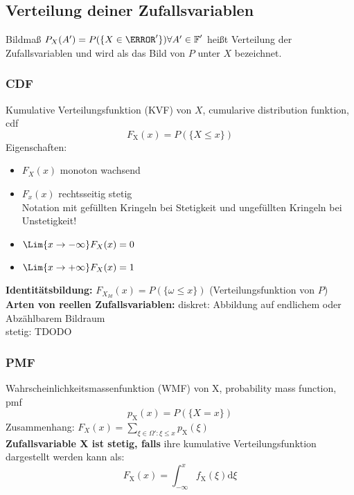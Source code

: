 \documentclass[german]{latex4ei/latex4ei_sheet}
\begin{document}
\subsection{Verteilung deiner Zufallsvariablen}
Bildma\ss{} $P_X(A')=P(\{X \in \A'\}) \forall A' \in \F'$ hei\ss{}t Verteilung der Zufallsvariablen und wird als das Bild von $P$ unter $X$ bezeichnet.
\subsubsection*{CDF}
Kumulative Verteilungsfunktion (KVF) von $X$, cumularive distribution funktion, cdf\\
\[F_\mathrm{X}(x)=P(\{X \le x\})\]
Eigenschaften:
\begin{itemize}
	\item $F_X(x)$ monoton wachsend
	\item $F_x(x)$ rechtsseitig stetig\\
		Notation mit gef\"ullten Kringeln bei Stetigkeit und ungef\"ullten Kringeln bei Unstetigkeit!
	\item $\Lim{x \to -\infty}F_X(x)=0$
	\item $\Lim{x \to + \infty} F_X(x)=1$
\end{itemize}
\textbf{Identit\"atsbildung:} $F_{X_{Id}}(x)=P(\{\omega \le x\})$ (Verteilungsfunktion von $P$)
\textbf{Arten von reellen Zufallsvariablen:}
diskret: Abbildung auf endlichem oder Abz\"ahlbarem Bildraum\\
stetig: TDODO\\
\subsubsection*{PMF}
Wahrscheinlichkeitsmassenfunktion (WMF) von X, probability mass function, pmf\\
\[p_\mathrm{X}(x)=P(\{X=x\})\]
Zusammenhang: $F_X(x)=\sum_{\xi \in \Omega':\xi \le x} p_\mathrm{X}(\xi)$\\
\textbf{Zufallsvariable X ist stetig, falls} ihre kumulative Verteilungsfunktion dargestellt werden kann als:
\[F_\mathrm{X}(x)=\int_{-\infty}^x f_\mathrm{X}(\xi) \mathrm{d} \xi\]
\end{document}
